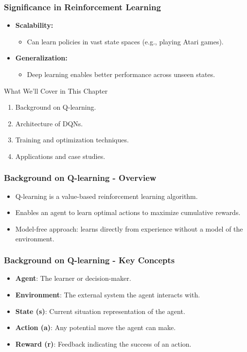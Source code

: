 \documentclass[aspectratio=169]{beamer}
\begin{document}
\begin{frame}[fragile]
    \frametitle{Significance in Reinforcement Learning}
    \begin{itemize}
        \item \textbf{Scalability:} 
        \begin{itemize}
            \item Can learn policies in vast state spaces (e.g., playing Atari games).
        \end{itemize}
        \item \textbf{Generalization:}
        \begin{itemize}
            \item Deep learning enables better performance across unseen states.
        \end{itemize}
    \end{itemize}
    
    \begin{block}{What We'll Cover in This Chapter}
        \begin{enumerate}
            \item Background on Q-learning.
            \item Architecture of DQNs.
            \item Training and optimization techniques.
            \item Applications and case studies.
        \end{enumerate}
    \end{block}
\end{frame}

\begin{frame}[fragile]
    \frametitle{Background on Q-learning - Overview}
    \begin{itemize}
        \item Q-learning is a value-based reinforcement learning algorithm.
        \item Enables an agent to learn optimal actions to maximize cumulative rewards.
        \item Model-free approach: learns directly from experience without a model of the environment.
    \end{itemize}
\end{frame}

\begin{frame}[fragile]
    \frametitle{Background on Q-learning - Key Concepts}
    \begin{itemize}
        \item \textbf{Agent}: The learner or decision-maker.
        \item \textbf{Environment}: The external system the agent interacts with.
        \item \textbf{State (s)}: Current situation representation of the agent.
        \item \textbf{Action (a)}: Any potential move the agent can make.
        \item \textbf{Reward (r)}: Feedback indicating the success of an action.
    \end{itemize}
\end{frame}
\end{document}

